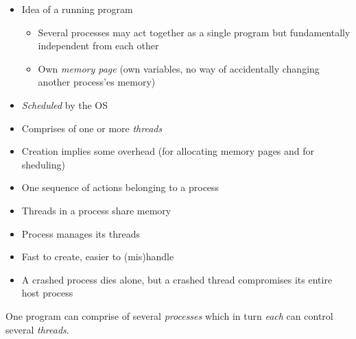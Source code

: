 \begin{frame}
%
\begin{tcbraster}[raster columns=2,
                  raster equal height,
                  nobeforeafter,
                  raster column skip=0.5cm]
\begin{defbox}[Process]
\small
\begin{itemize}
\item Idea of a running program
	\begin{itemize}
	\item Several processes may act together as a single program but fundamentally independent from each other
	\item Own \emph{memory page} (\ie own variables, no way of accidentally changing another process'es memory)
	\end{itemize}
\item \emph{Scheduled} by the OS
\item Comprises of one or more \emph{threads}
\item Creation implies some overhead (\zB for allocating memory pages and for sheduling)
\end{itemize}
\end{defbox}
%
\begin{defbox}[Thread]
\small
\begin{itemize}
\item One sequence of actions belonging to a process
\item Threads in a process share memory
\item Process manages its threads
\item Fast to create, easier to (mis)handle
\item A crashed process dies alone, but a crashed thread compromises its entire host process
\end{itemize}
One program can comprise of several \emph{processes} which in turn \emph{each} can control several \emph{threads}.
\end{defbox}
\end{tcbraster}
%
\end{frame}



